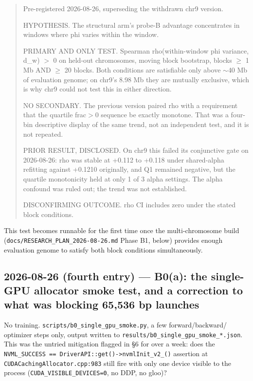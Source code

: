 \documentclass[11pt,a4paper]{article}
\newcommand{\code}[1]{\texttt{\small #1}}
\begin{document}
\begin{quote}\small
Pre-registered 2026-08-26, superseding the withdrawn chr9 version.

HYPOTHESIS. The structural arm's probe-B advantage concentrates in windows
where phi varies within the window.

PRIMARY AND ONLY TEST. Spearman rho(within-window phi variance, d\_w) $>$ 0 on
held-out chromosomes, moving block bootstrap, blocks $\geq$ 1 Mb AND $\geq$ 20
blocks. Both conditions are satisfiable only above $\sim$40 Mb of evaluation
genome; on chr9's 8.98 Mb they are mutually exclusive, which is why chr9 could
not test this in either direction.

NO SECONDARY. The previous version paired rho with a requirement that the
quartile frac$>$0 sequence be exactly monotone. That was a four-bin
descriptive display of the same trend, not an independent test, and it is not
repeated.

PRIOR RESULT, DISCLOSED. On chr9 this failed its conjunctive gate on
2026-08-26: rho was stable at +0.112 to +0.118 under shared-alpha refitting
against +0.1210 originally, and Q1 remained negative, but the quartile
monotonicity held at only 1 of 3 alpha settings. The alpha confound was ruled
out; the trend was not established.

DISCONFIRMING OUTCOME. rho CI includes zero under the stated block
conditions.
\end{quote}

This test becomes runnable for the first time once the multi-chromosome build
(\code{docs/RESEARCH\_PLAN\_2026-08-26.md} Phase B1, below) provides enough
evaluation genome to satisfy both block conditions simultaneously.

\subsection*{2026-08-26 (fourth entry) --- B0(a): the single-GPU allocator
smoke test, and a correction to what was blocking 65,536 bp launches}

No training. \code{scripts/b0\_single\_gpu\_smoke.py}, a few forward/backward/
optimizer steps only, output written to
\code{results/b0\_single\_gpu\_smoke\_*.json}. This was the untried mitigation
flagged in \S6 for over a week: does the
\code{NVML\_SUCCESS == DriverAPI::get()->nvmlInit\_v2\_()} assertion at
\code{CUDACachingAllocator.cpp:983} still fire with only one device visible to
the process (\code{CUDA\_VISIBLE\_DEVICES=0}, no DDP, no gloo)?
\end{document}
